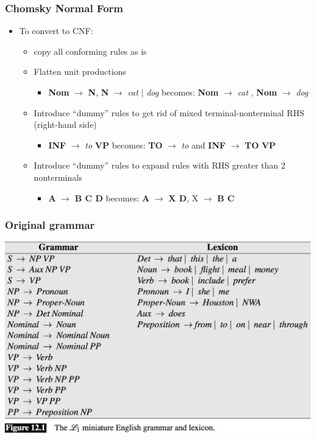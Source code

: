 \documentclass{beamer}
\begin{document}
\begin{frame}
\frametitle{Chomsky Normal Form}
\begin{itemize}
\item To convert to CNF:
\begin{itemize}
\item copy all conforming rules as is
\item Flatten unit productions
\begin{itemize}
\item {\bf Nom} $\rightarrow$ {\bf N},  {\bf N} $\rightarrow$ {\it cat} $\vert$ {\it dog} becomes: {\bf Nom} $\rightarrow$ {\it cat} , {\bf Nom} $\rightarrow$ {\it dog}
\end{itemize}
\item Introduce ``dummy'' rules to get rid of mixed terminal-nonterminal RHS (right-hand side)
\begin{itemize}
\item {\bf INF} $\rightarrow$ {\it to} {\bf VP} becomes: {\bf TO} $\rightarrow$ {\it to} and  {\bf INF} $\rightarrow$ {\bf TO} {\bf VP}
\end{itemize}
\item Introduce ``dummy'' rules to expand rules with RHS greater than 2 nonterminals
\begin{itemize}
\item {\bf A} $\rightarrow$ {\bf B C D} becomes: {\bf A} $\rightarrow$ {\bf X D}, X $\rightarrow$ {\bf B C}
\end{itemize}
\end{itemize}
\end{itemize}
\end{frame}


\begin{frame}
\frametitle{Original grammar}
\includegraphics[width=\textwidth]{figures/grammar}
\end{frame}
\end{document}
